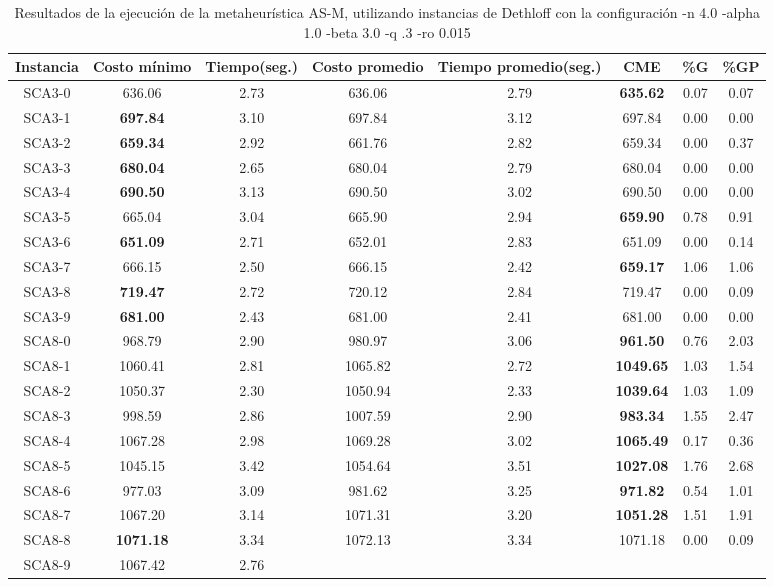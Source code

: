 \begin{table}[h]
\caption{Resultados de la ejecución de la metaheurística AS-M, utilizando instancias de Dethloff con la configuración -n 4.0 -alpha 1.0 -beta 3.0 -q .3 -ro 0.015}
\centering
\small
\begin{tabular}{c c c c c c c c}
\hline\hline
Instancia & Costo mínimo & Tiempo(seg.) & Costo promedio & Tiempo promedio(seg.) & CME & \%G & \%GP \\ [0.5ex]
\hline
SCA3-0 & 636.06 & 2.73 & 
636.06 & 2.79 & \bf{635.62} & 
0.07 & 0.07\\SCA3-1 & \bf{697.84} & 3.10 & 
697.84 & 3.12 & 697.84 & 0.00
 & 0.00\\
SCA3-2 & \bf{659.34} & 2.92 & 
661.76 & 2.82 & 659.34 & 0.00
 & 0.37\\SCA3-3 & \bf{680.04} & 2.65 & 
680.04 & 2.79 & 680.04 & 0.00
 & 0.00\\
SCA3-4 & \bf{690.50} & 3.13 & 
690.50 & 3.02 & 690.50 & 0.00
 & 0.00\\
SCA3-5 & 665.04 & 3.04 & 
665.90 & 2.94 & \bf{659.90} & 
0.78 & 0.91\\SCA3-6 & \bf{651.09} & 2.71 & 
652.01 & 2.83 & 651.09 & 0.00
 & 0.14\\SCA3-7 & 666.15 & 2.50 & 
666.15 & 2.42 & \bf{659.17} & 
1.06 & 1.06\\SCA3-8 & \bf{719.47} & 2.72 & 
720.12 & 2.84 & 719.47 & 0.00
 & 0.09\\SCA3-9 & \bf{681.00} & 2.43 & 
681.00 & 2.41 & 681.00 & 0.00
 & 0.00\\
SCA8-0 & 968.79 & 2.90 & 
980.97 & 3.06 & \bf{961.50} & 
0.76 & 2.03\\SCA8-1 & 1060.41 & 2.81 & 
1065.82 & 2.72 & \bf{1049.65} & 
1.03 & 1.54\\SCA8-2 & 1050.37 & 2.30 & 
1050.94 & 2.33 & \bf{1039.64} & 
1.03 & 1.09\\SCA8-3 & 998.59 & 2.86 & 
1007.59 & 2.90 & \bf{983.34} & 
1.55 & 2.47\\SCA8-4 & 1067.28 & 2.98 & 
1069.28 & 3.02 & \bf{1065.49} & 
0.17 & 0.36\\SCA8-5 & 1045.15 & 3.42 & 
1054.64 & 3.51 & \bf{1027.08} & 
1.76 & 2.68\\SCA8-6 & 977.03 & 3.09 & 
981.62 & 3.25 & \bf{971.82} & 
0.54 & 1.01\\SCA8-7 & 1067.20 & 3.14 & 
1071.31 & 3.20 & \bf{1051.28} & 
1.51 & 1.91\\SCA8-8 & \bf{1071.18} & 3.34 & 
1072.13 & 3.34 & 1071.18 & 0.00
 & 0.09\\SCA8-9 & 1067.42 & 2.76 & 

\end{tabular}
\end{table}

